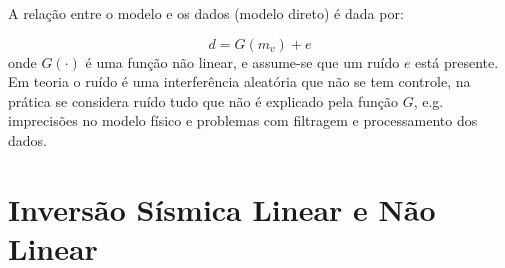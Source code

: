 A relação entre o modelo e os dados (modelo direto) é dada por:

\begin{equation}
d = G(m_v) + e
\end{equation}
onde $G(\cdot)$ é uma função não linear, e assume-se que um ruído $e$ está
presente. Em teoria o ruído é uma interferência aleatória que não se tem
controle, na prática se considera ruído tudo que não é explicado pela função
$G$, e.g. imprecisões no modelo físico e problemas com filtragem e processamento
dos dados.

\section{Inversão Sísmica Linear e Não Linear}

% 
% 
% 
% 
% 
% 
